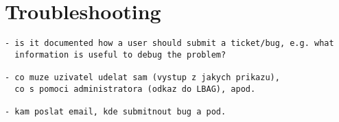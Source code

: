 \section{Troubleshooting}


\begin{verbatim}
- is it documented how a user should submit a ticket/bug, e.g. what
  information is useful to debug the problem?

- co muze uzivatel udelat sam (vystup z jakych prikazu), 
  co s pomoci administratora (odkaz do LBAG), apod.

- kam poslat email, kde submitnout bug a pod.
\end{verbatim}
